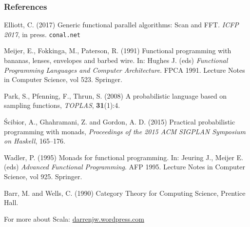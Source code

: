 \documentclass[mathserif,handout]{beamer}
\begin{document}

\begin{frame}
  \frametitle{References}
  \begin{thebibliography}{}

    \scriptsize

  \bibitem{} Elliott, C. (2017) \alert{Generic functional parallel algorithms: Scan and FFT}. \emph{ICFP 2017}, in press. \texttt{conal.net}
    
    \bibitem{} Meijer, E., Fokkinga, M., Paterson, R. (1991) \alert{Functional programming with bananas, lenses, envelopes and barbed wire}. In: Hughes J. (eds) \emph{Functional Programming Languages and Computer Architecture}. FPCA 1991. Lecture Notes in Computer Science, vol 523. Springer.

    \bibitem{} Park, S., Pfenning, F., Thrun, S. (2008) \alert{A probabilistic language based on sampling functions}, \emph{TOPLAS}, \textbf{31}(1):4.

   \'{S}cibior, A., Ghahramani, Z. and Gordon, A. D. (2015) \alert{Practical probabilistic programming with monads}, \emph{Proceedings of the 2015 ACM SIGPLAN Symposium on Haskell}, 165--176.

     \bibitem{} Wadler, P. (1995) \alert{Monads for functional programming}. In: Jeuring J., Meijer E. (eds) \emph{Advanced Functional Programming}. AFP 1995. Lecture Notes in Computer Science, vol 925. Springer.
    
\beamertemplatebookbibitems

 Barr, M. and Wells, C. (1990) \alert{Category Theory for Computing Science}, Prentice Hall.
    
  \end{thebibliography}

  
For more about Scala: \alert{\url{darrenjw.wordpress.com}}

\end{frame}
\end{document}
